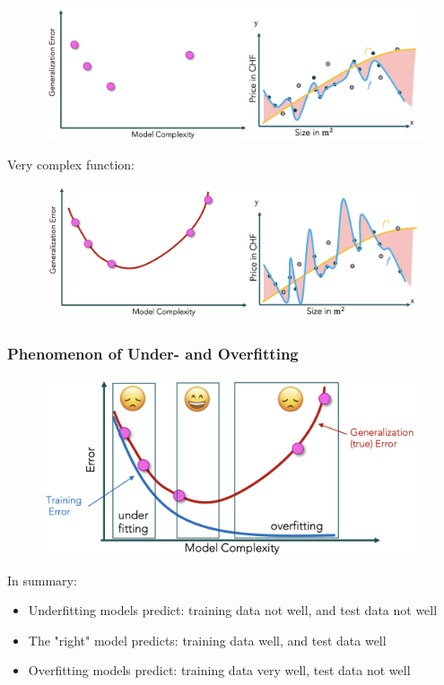 \documentclass[a4paper]{extarticle}
\begin{document}
\begin{figure}[H]
    \includegraphics[width=15cm]{../images/IntroML_Fig3-14}
    \centering
\end{figure}

Very complex function:

\begin{figure}[H]
    \includegraphics[width=15cm]{../images/IntroML_Fig3-15}
    \centering
\end{figure}

\subsubsection{Phenomenon of Under- and Overfitting}

\begin{figure}[H]
    \includegraphics[width=11cm]{../images/IntroML_Fig3-16}
    \centering
\end{figure}

In summary:

\begin{itemize}
    \item Underfitting models predict: training data not well, and test data not well
    \item The "right" model predicts: training data well, and test data well
    \item Overfitting models predict: training data very well, test data not well
\end{itemize}
\end{document}
